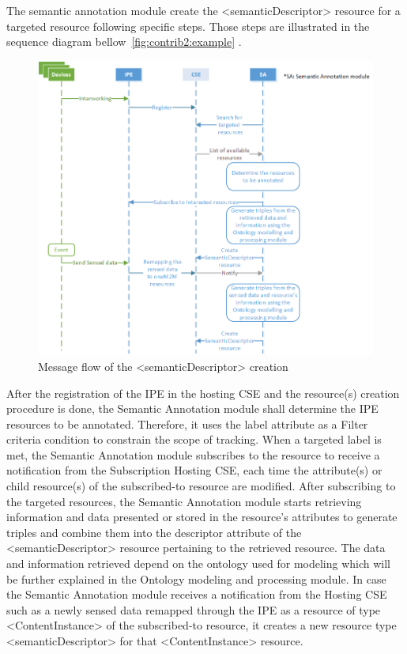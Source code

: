 The semantic annotation module create the <semanticDescriptor> resource for a targeted resource following specific steps. Those steps are illustrated in the sequence diagram bellow~\ref{fig:contrib2:example} .\par
\begin{figure}[htbp]
    \centering
    \includegraphics[width=1.2\textwidth]{resources/images/sequence1}
    \caption{Message flow of the <semanticDescriptor> creation }\label{fig:contrib2:sequence1}
\end{figure}
After the registration of the IPE in the hosting CSE and the resource(s) creation procedure is done, the Semantic Annotation module shall determine the IPE resources to be annotated. Therefore, it uses the label attribute as a Filter criteria condition to constrain the scope of tracking. When a targeted label is met, the Semantic Annotation module subscribes to the resource to receive a notification from the Subscription Hosting CSE, each time the attribute(s) or child resource(s) of the subscribed-to resource are modified. After subscribing to the targeted resources, the Semantic Annotation module starts retrieving information and data presented or stored in the resource’s attributes to generate triples and combine them into the descriptor attribute of the <semanticDescriptor> resource pertaining to the retrieved resource. The data and information retrieved depend on the ontology used for modeling which will be further explained in the Ontology modeling and processing module. In case the Semantic Annotation module receives a notification from the Hosting CSE such as a newly sensed data remapped through the IPE as a resource of type <ContentInstance> of the subscribed-to resource, it creates a new resource type <semanticDescriptor> for that <ContentInstance> resource. \par
